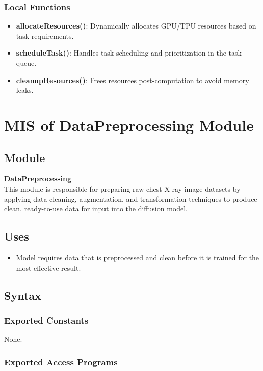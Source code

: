 \documentclass[12pt, titlepage]{article}
\begin{document}
\subsubsection{Local Functions}
\begin{itemize}
    \item \textbf{allocateResources()}: Dynamically allocates GPU/TPU resources based on task requirements.
    \item \textbf{scheduleTask()}: Handles task scheduling and prioritization in the task queue.
    \item \textbf{cleanupResources()}: Frees resources post-computation to avoid memory leaks.
\end{itemize}

\section{MIS of DataPreprocessing Module} \label{mDataPreproc}

\subsection{Module}
\textbf{DataPreprocessing} \\
This module is responsible for preparing raw chest X-ray image datasets by applying data cleaning, augmentation, and transformation techniques to produce clean, ready-to-use data for input into the diffusion model.

\subsection{Uses}
\begin{itemize}
    \item Model requires data that is preprocessed and clean before it is trained for the most effective result.
\end{itemize}

\subsection{Syntax}

\subsubsection{Exported Constants}
None.

\subsubsection{Exported Access Programs}
\end{document}
